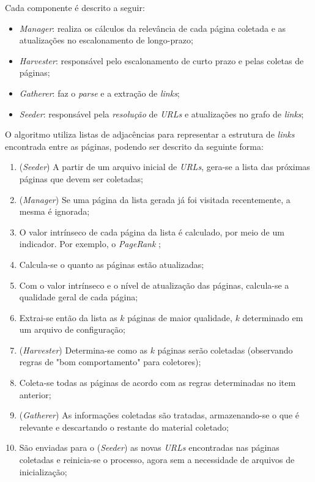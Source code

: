 \documentclass[a4paper,12pt,titlepage]{article}
\begin{document}
Cada componente é descrito a seguir: 

\begin{itemize}
\item \textit{Manager}: realiza os cálculos da relevância de cada página coletada e as atualizações no escalonamento de longo-prazo;
\item \textit{Harvester}: responsável pelo escalonamento de curto prazo e pelas coletas de páginas;
\item \textit{Gatherer}: faz o \textit{parse} e a extração de \textit{links};
\item \textit{Seeder}: responsável pela \textit{resolução} de \textit{URLs} e atualizações no grafo de \textit{links};
\end{itemize} 

O algoritmo utiliza listas de adjacências para representar a estrutura de \textit{links} encontrada entre as páginas, podendo ser descrito da seguinte forma:

\begin{enumerate}
\item (\textit{Seeder}) A partir de um arquivo inicial de \textit{URLs}, gera-se a lista das próximas páginas que devem ser coletadas;
\item (\textit{Manager}) Se uma página da lista gerada já foi visitada recentemente, a mesma é ignorada;
\item O valor intrínseco de cada página da lista é calculado, por meio de um indicador. Por exemplo, o \textit{PageRank} \cite{pagerank};
\item Calcula-se o quanto as páginas estão atualizadas;
\item Com o valor intrínseco e o nível de atualização das páginas, calcula-se a qualidade geral de cada página;
\item Extrai-se então da lista as $k$ páginas de maior qualidade, $k$ determinado em um arquivo de configuração;
\item (\textit{Harvester}) Determina-se como as $k$ páginas serão coletadas (observando regras de "bom comportamento" para coletores);
\item Coleta-se todas as páginas de acordo com as regras determinadas no item anterior;
\item (\textit{Gatherer}) As informações coletadas são tratadas, armazenando-se o que é relevante e descartando o restante do material coletado;
\item São enviadas para o (\textit{Seeder}) as novas \textit{URLs} encontradas nas páginas coletadas e reinicia-se o processo, agora sem a necessidade de arquivos de inicialização;
\end{enumerate}
\end{document}
